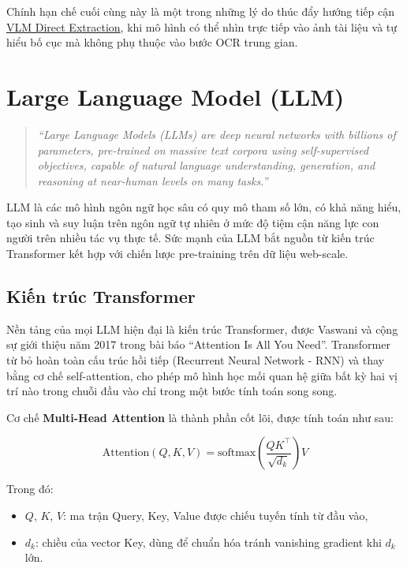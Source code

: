 ﻿\documentclass[12pt]{report}
\begin{document}
Chính hạn chế cuối cùng này là một trong những lý do thúc đẩy hướng tiếp cận \hyperref[sec:vlm_pipeline]{VLM Direct Extraction}, khi mô hình có thể nhìn trực tiếp vào ảnh tài liệu và tự hiểu bố cục mà không phụ thuộc vào bước OCR trung gian.

\section{Large Language Model (LLM)}\label{sec:llm}

\begin{quote}
\emph{``Large Language Models (LLMs) are deep neural networks with billions of parameters, pre-trained on massive text corpora using self-supervised objectives, capable of natural language understanding, generation, and reasoning at near-human levels on many tasks.''} \cite{openai2023gpt4}
\end{quote}

LLM là các mô hình ngôn ngữ học sâu có quy mô tham số lớn, có khả năng hiểu, tạo sinh và suy luận trên ngôn ngữ tự nhiên ở mức độ tiệm cận năng lực con người trên nhiều tác vụ thực tế. Sức mạnh của LLM bắt nguồn từ kiến trúc Transformer kết hợp với chiến lược pre-training trên dữ liệu web-scale.

\subsection{Kiến trúc Transformer}\label{sec:transformer}

Nền tảng của mọi LLM hiện đại là kiến trúc Transformer, được Vaswani và cộng sự \cite{vaswani2017attention} giới thiệu năm 2017 trong bài báo ``Attention Is All You Need''. Transformer từ bỏ hoàn toàn cấu trúc hồi tiếp (Recurrent Neural Network - RNN) và thay bằng cơ chế self-attention, cho phép mô hình học mối quan hệ giữa bất kỳ hai vị trí nào trong chuỗi đầu vào chỉ trong một bước tính toán song song.

Cơ chế \textbf{Multi-Head Attention} là thành phần cốt lõi, được tính toán như sau:

\begin{equation}
    \text{Attention}(Q, K, V) = \text{softmax}\left(\frac{QK^\top}{\sqrt{d_k}}\right)V
\end{equation}

Trong đó:
\begin{itemize}
    \item $Q$, $K$, $V$: ma trận Query, Key, Value được chiếu tuyến tính từ đầu vào,
    \item $d_k$: chiều của vector Key, dùng để chuẩn hóa tránh vanishing gradient khi $d_k$ lớn.
\end{itemize}
\end{document}
